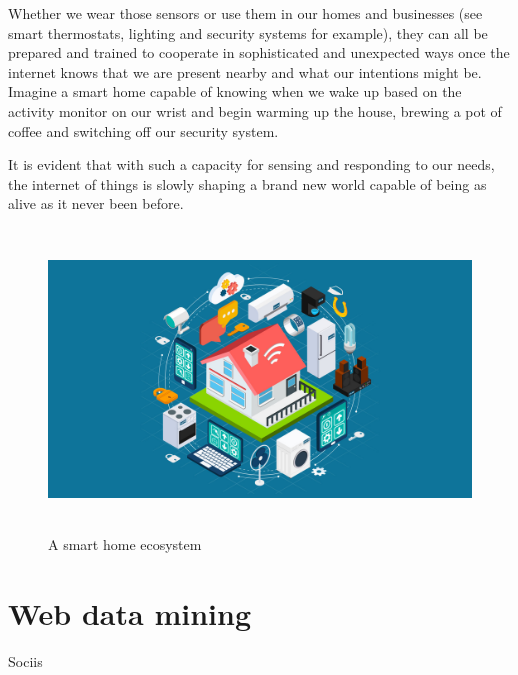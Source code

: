 Whether we wear those sensors or use them in our homes and businesses (see smart thermostats, lighting and security systems for example), they can all be prepared and trained to cooperate in sophisticated and unexpected ways once the internet knows that we are present nearby and what our intentions might be. Imagine a smart home capable of knowing when we wake up based on the activity monitor on our wrist and begin warming up the house, brewing a pot of coffee and switching off our security system. 

It is evident that with such a capacity for sensing and responding to our needs,  the internet of things is slowly shaping a brand new world capable of being as alive as it never been before.


\vspace{0.5cm}
\begin{figure}[htbp]
  \centering
    \includegraphics[height=8cm]{images/iot}
  \caption{A smart home ecosystem}
  \label{fig:iot}
\end{figure}
\vspace{0.5cm}

\section{Web data mining}

Sociis

